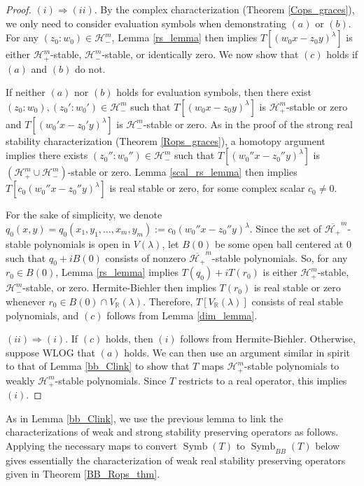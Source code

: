 \documentclass{article}
\theoremstyle{definition}
\theoremstyle{plain}
\newcommand{\R}{\mathbb{R}}
\newcommand{\UHP}{\mathcal{H}_+}
\newcommand{\LHP}{\mathcal{H}_-}
\DeclareMathOperator{\Symb}{Symb}
\begin{document}
\begin{proof}
    $(i) \Rightarrow (ii)$. By the complex characterization (Theorem \ref{Cops_graces}), we only need to consider evaluation symbols when demonstrating $(a)$ or $(b)$. For any $(z_0:w_0) \in \LHP^m$, Lemma \ref{rs_lemma} then implies $T[(w_0x-z_0y)^\lambda]$ is either $\UHP^m$-stable, $\LHP^m$-stable, or identically zero. We now show that $(c)$ holds if $(a)$ and $(b)$ do not.
    
    If neither $(a)$ nor $(b)$ holds for evaluation symbols, then there exist $(z_0:w_0),(z_0':w_0') \in \LHP^m$ such that $T[(w_0x-z_0y)^\lambda]$ is $\UHP^m$-stable or zero and $T[(w_0'x-z_0'y)^\lambda]$ is $\LHP^m$-stable or zero. As in the proof of the strong real stability characterization (Theorem \ref{Rops_graces}), a homotopy argument implies there exists $(z_0'':w_0'') \in \LHP^m$ such that $T[(w_0''x-z_0''y)^\lambda]$ is $(\UHP^m \cup \LHP^m)$-stable or zero. Lemma \ref{scal_rs_lemma} then implies $T[c_0(w_0''x-z_0''y)^\lambda]$ is real stable or zero, for some complex scalar $c_0 \neq 0$.
    
    For the sake of simplicity, we denote $q_0(x,y) = q_0(x_1,y_1,\ldots,x_m,y_m) := c_0(w_0''x-z_0''y)^\lambda$. Since the set of $\overline{\UHP}^m$-stable polynomials is open in $V(\lambda)$, let $B(0)$ be some open ball centered at $0$ such that $q_0 + iB(0)$ consists of nonzero $\overline{\UHP}^m$-stable polynomials. So, for any $r_0 \in B(0)$, Lemma \ref{rs_lemma} implies $T(q_0) + iT(r_0)$ is either $\UHP^m$-stable, $\LHP^m$-stable, or zero. Hermite-Biehler then implies $T(r_0)$ is real stable or zero whenever $r_0 \in B(0) \cap V_\R(\lambda)$. Therefore, $T[V_\R(\lambda)]$ consists of real stable polynomials, and $(c)$ follows from Lemma \ref{dim_lemma}.
    
    $(ii) \Rightarrow (i)$. If $(c)$ holds, then $(i)$ follows from Hermite-Biehler. Otherwise, suppose WLOG that $(a)$ holds. We can then use an argument similar in spirit to that of Lemma \ref{bb_Clink} to show that $T$ maps $\UHP^m$-stable polynomials to weakly $\UHP^m$-stable polynomials. Since $T$ restricts to a real operator, this implies $(i)$.
\end{proof}

As in Lemma \ref{bb_Clink}, we use the previous lemma to link the characterizations of weak and strong stability preserving operators as follows. Applying the necessary maps to convert $\Symb(T)$ to $\Symb_{BB}(T)$ below gives essentially the characterization of weak real stability preserving operators given in Theorem \ref{BB_Rops_thm}.
\end{document}
